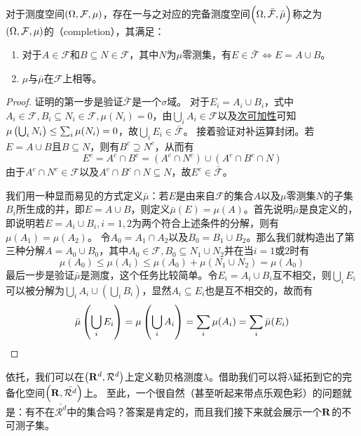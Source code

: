 \documentclass[main.tex]{subfiles}
\begin{document}
\begin{theorem} \label{thm:a.2.3}
	对于测度空间\(\del{\Omega, \mathcal{F}, \mu}\)，存在一与之对应的完备测度空间\(\del{\Omega, \bar{\mathcal{F}}, \bar{\mu}}\)称之为\(\del{\Omega, \mathcal{F}, \mu}\)的（completion），其满足：\begin{enumerate}
		\item 对于\(A\in \mathcal{F}\)和\(B\subseteq N \in \mathcal{F}\)，其中\(N\)为\(\mu\)零测集，有\(E \in \bar{\mathcal{F}} \Leftrightarrow E = A\cup B\)。
		\item \(\mu\)与\(\bar{\mu}\)在\(\mathcal{F}\)上相等。
	\end{enumerate}
\end{theorem}
\begin{proof}
	证明的第一步是验证\(\bar{\mathcal{F}}\)是一个\(\sigma\)域。
	对于\(E_i = A_i\cup B_i\)，式中\(A_i \in \mathcal{F}, B_i \subseteq N_i \in \mathcal{F}, \mu(N_i)=0\)，由\(\bigcup_{i}A_i \in \mathcal{F}\)以及\hyperref[prop:a.1.subadditivity]{次可加性}可知\(\mu\del{\bigcup_i N_i} \leq \sum_i \mu(N_i) = 0\)，故\(\bigcup_i E_i \in \bar{\mathcal{F}}\)。
	接着验证对补运算封闭。若\(E = A\cup B\)且\(B \subseteq N\)，则有\(B^c \supseteq N^c\)，从而有
	\[E^c = A^c \cap B^c = (A^c\cap N^c)\cup(A^c\cap B^c\cap N)\]
	由于\(A^c\cap N^c \in \mathcal{F}\)以及\(A^c\cap B^c\cap N \subseteq N\)，故\(E^c \in \bar{\mathcal{F}}\)。

	我们用一种显而易见的方式定义\(\bar{\mu}\)：若\(E\)是由来自\(\mathcal{F}\)的集合\(A\)以及\(\mu\)零测集\(N\)的子集\(B_i\)所生成的并，即\(E = A \cup B\)，则定义\(\bar{\mu}(E) = \mu(A)\)。首先说明\(\bar{\mu}\)是良定义的，即说明若\(E = A_i\cup B_i, i=1,2\)为两个符合上述条件的分解，则有\(\mu(A_1)=\mu(A_2)\)。
	令\(A_0 = A_1\cap A_2\)以及\(B_0 = B_1\cup B_2\)。那么我们就构造出了第三种分解\(A = A_0\cup B_0\)，其中\(A_0 \in \mathcal{F}, B_0 \subseteq N_1\cup N_2\)并在当\(i=1\)或\(2\)时有
	\[\mu(A_0) \leq \mu(A_i) \leq \mu(A_0) + \mu(N_1\cup N_2) = \mu(A_0)\]
	最后一步是验证\(\bar{\mu}\)是测度，这个任务比较简单。令\(E_i = A_i \cup B_i\)互不相交，则\(\bigcup_i E_i\)可以被分解为\(\bigcup_i A_i\cup (\bigcup_i B_i)\)，显然\(A_i \subseteq E_i\)也是互不相交的，故而有
	\[\bar{\mu}\del{\bigcup_i E_i} = \mu\del{\bigcup_i A_i} = \sum_i \mu(A_i) = \sum_i \bar{\mu}(E_i)\]
\end{proof}

依托，我们可以在\(\del{\R^d, \mathcal{R}^d}\)上定义勒贝格测度\(\lambda\)。借助我们可以将\(\lambda\)延拓到它的完备化空间\(\del{\R, \bar{\mathcal{R}^d}}\)上。
至此，一个很自然（甚至听起来带点乐观色彩）的问题就是：有不在\(\bar{\mathcal{R}^d}\)中的集合吗？答案是肯定的，而且我们接下来就会展示一个\(\mathbf{R}\)的不可测子集。
\end{document}
